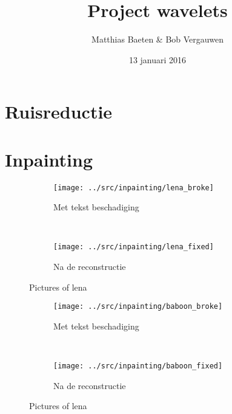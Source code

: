 

\title{Project wavelets}
\author{Matthias Baeten \& Bob Vergauwen}
\date{ 13 januari 2016}



\maketitle

\section{Ruisreductie}


\section{Inpainting}

\begin{figure}
    \centering
    \begin{subfigure}[b]{0.45\textwidth}
        \texttt{[image: ../src/inpainting/lena\_broke]}
        \caption{Met tekst beschadiging}
        \label{fig:tiger}
    \end{subfigure}
    ~ %
    \begin{subfigure}[b]{0.45\textwidth}
        \texttt{[image: ../src/inpainting/lena\_fixed]}
        \caption{Na de reconstructie}
        \label{fig:mouse}
    \end{subfigure}
    \caption{Pictures of lena}\label{fig:animals}
\end{figure}




\begin{figure}
    \centering
    \begin{subfigure}[b]{0.45\textwidth}
        \texttt{[image: ../src/inpainting/baboon\_broke]}
        \caption{Met tekst beschadiging}
        \label{fig:tiger}
    \end{subfigure}
    ~ %
    \begin{subfigure}[b]{0.45\textwidth}
        \texttt{[image: ../src/inpainting/baboon\_fixed]}
        \caption{Na de reconstructie}
        \label{fig:mouse}
    \end{subfigure}
    \caption{Pictures of lena}\label{fig:baboon}
\end{figure}


